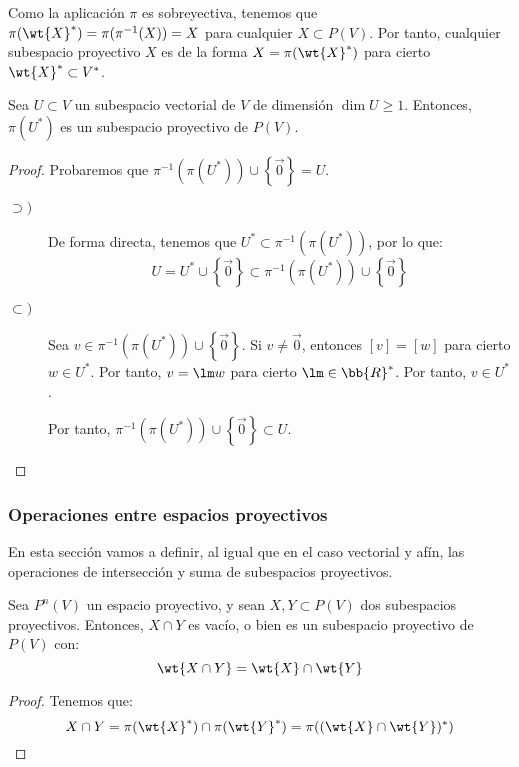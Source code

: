 Como la aplicación $\pi$ es sobreyectiva, tenemos que $\pi(\wt{X}^\ast)=\pi(\pi^{-1}(X))=X$ para cualquier $X\subset P(V)$.
Por tanto, cualquier subespacio proyectivo $X$ es de la forma $X=\pi(\wt{X}^\ast)$ para cierto $\wt{X}^\ast\subset V^\ast$. 
\begin{prop}
    Sea $U\subset V$ un subespacio vectorial de $V$ de dimensión $\dim U \geq 1$. Entonces, $\pi(U^\ast)$ es un subespacio proyectivo de $P(V)$.
\end{prop}
\begin{proof}
    Probaremos que $\pi^{-1}(\pi(U^\ast))\cup \left\{\vec{0}\right\}=U$.
    \begin{description}
        \item[$\supset)$] De forma directa, tenemos que $U^\ast \subset \pi^{-1}(\pi(U^\ast))$, por lo que:
        \begin{equation*}
            U = U^\ast \cup \left\{\vec{0}\right\} \subset \pi^{-1}(\pi(U^\ast))\cup \left\{\vec{0}\right\}
        \end{equation*}

        \item[$\subset)$] Sea $v\in \pi^{-1}(\pi(U^\ast))\cup \left\{\vec{0}\right\}$.
        Si $v\neq \vec{0}$, entonces $[v]=[w]$ para cierto $w\in U^\ast$. Por tanto, $v=\lm w$ para cierto $\lm \in \bb{R}^\ast$. Por tanto, $v\in U^\ast$.

        Por tanto, $\pi^{-1}(\pi(U^\ast))\cup \left\{\vec{0}\right\} \subset U$.
    \end{description}
\end{proof}

\subsubsection{Operaciones entre espacios proyectivos}

En esta sección vamos a definir, al igual que en el caso vectorial y afín, las operaciones de intersección y suma de subespacios proyectivos.
\begin{prop}[Intersección]
    Sea $P^n(V)$ un espacio proyectivo, y sean $X,Y\subset P(V)$ dos subespacios proyectivos. Entonces, $X\cap Y$ es vacío, o bien es un subespacio proyectivo de $P(V)$ con:
    \begin{equation*}
        \wt{X\cap Y} = \wt{X} \cap \wt{Y}
    \end{equation*}
\end{prop}
\begin{proof}
    Tenemos que:
    \begin{equation*}
        X\cap Y = \pi(\wt{X}^\ast) \cap \pi(\wt{Y}^\ast) = \pi((\wt{X}\cap \wt{Y})^\ast)
    \end{equation*}
\end{proof}

